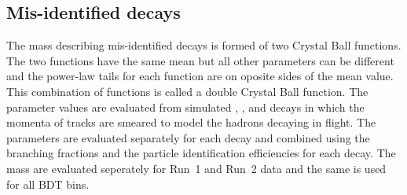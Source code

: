 \subsection[Mis-identified \bhh decays]{Mis-identified \boldmath{\bhh} decays}%
The mass \pdf describing mis-identified \bhh decays is formed of two Crystal Ball functions. The two functions have the same mean but all other parameters can be different and the power-law tails for each function are on oposite sides of the mean value. This combination of functions is called a double Crystal Ball function. The parameter values are evaluated from simulated \bdkpi, \bskk, \bdpipi and \bskpi decays in which the momenta of tracks are smeared to model the hadrons decaying in flight. The parameters are evaluated separately for each \bhh decay and combined using the branching fractions and the particle identification efficiencies for each decay. The mass \pdfs are evaluated seperately for Run~1 and Run~2 data and the same \pdf is used for all BDT bins.

